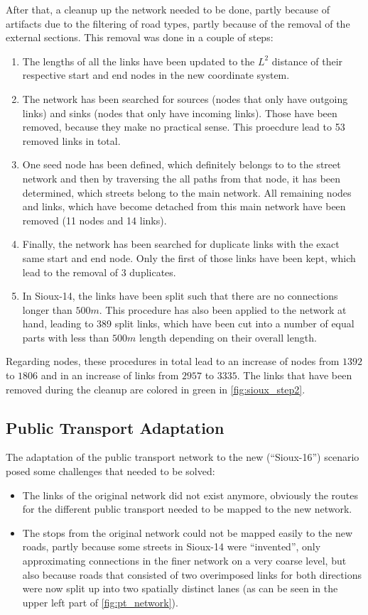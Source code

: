 After that, a cleanup up the network needed to be done, partly because of artifacts
due to the filtering of road types, partly because of the removal of the external
sections. This removal was done in a couple of steps:

\begin{enumerate}
\item The lengths of all the links have been updated to the $L^2$ distance of their
respective start and end nodes in the new coordinate system.
\item The network has been searched for sources (nodes that only have outgoing links)
and sinks (nodes that only have incoming links). Those have been removed, because they
make no practical sense. This proecdure lead to 53 removed links in total.
\item One seed node has been defined, which definitely belongs to to the street
network and then by traversing the all paths from that node, it has been determined,
which streets belong to the main network. All remaining nodes and links, which have
become detached from this main network have been removed (11 nodes and 14 links).
\item Finally, the network has been searched for duplicate links with the exact
same start and end node. Only the first of those links have been kept, which lead
to the removal of 3 duplicates.
\item In Sioux-14, the links have been split such that there are no connections
longer than $500m$. This procedure has also been applied to the network at hand,
leading to 389 split links, which have been cut into a number of equal parts
with less than $500m$ length depending on their overall length.
\end{enumerate}

Regarding nodes, these procedures in total lead to an increase of nodes from
$1392$ to $1806$ and in an increase of links from $2957$ to $3335$. The links
that have been removed during the cleanup are colored in green in \cref{fig:sioux_step2}.

\subsection{Public Transport Adaptation}

The adaptation of the public transport network to the new (``Sioux-16'') scenario posed some
challenges that needed to be solved:

\begin{itemize}
\item The links of the original network did not exist anymore, obviously the
routes for the different public transport needed to be mapped to the new network.
\item The stops from the original network could not be mapped easily to the new
roads, partly because some streets in Sioux-14 were ``invented'', only approximating
connections in the finer network on a very coarse level, but also because roads
that consisted of two overimposed links for both directions were now split up into
two spatially distinct lanes (as can be seen in the upper left part of \cref{fig:pt_network}).
\end{itemize}

